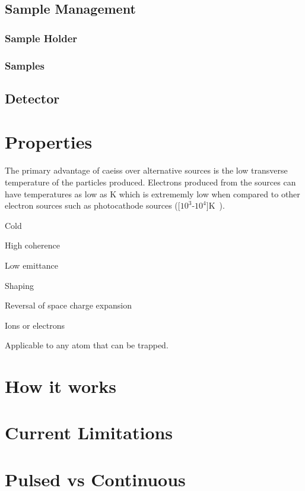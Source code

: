 \subsection{Sample Management}

\subsubsection{Sample Holder}

\subsubsection{Samples}

\subsection{Detector}

\section{Properties}

The primary advantage of \glspl{caeis} over alternative sources is the low transverse temperature of the particles produced.
Electrons produced from the sources can have temperatures as low as \unit[10]{K} which is extrememly low when compared to other electron sources such as photocathode sources (\unit[$10^3$-$10^4$]{K}~\cite{claessens_ultracold_2005}).

Cold

High coherence

Low emittance

Shaping

Reversal of space charge expansion

Ions or electrons

Applicable to any atom that can be trapped.


\section{How it works}

\label{section:two_stage_ionisation}
\label{section:excess_energy}
\label{section:pulse_blaster}

\section{Current Limitations}

\section{Pulsed vs Continuous}

